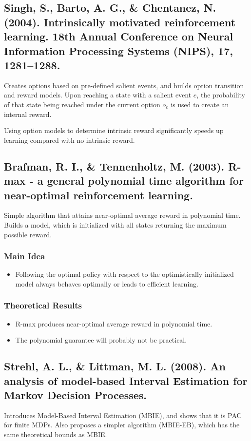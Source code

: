 \documentclass[12pt, oneside]{amsart}
\begin{document}
\subsection*{Singh, S., Barto, A. G., \& Chentanez, N. (2004). Intrinsically motivated reinforcement learning. 18th Annual Conference on Neural Information Processing Systems (NIPS), 17, 1281–1288.}
Creates options based on pre-defined salient events, and builds option transition and reward models. Upon reaching a state with a salient event $e$, the probability of that state being reached under the current option $o_e$ is used to create an internal reward.

Using option models to determine intrinsic reward significantly speeds up learning compared with no intrinsic reward.

\subsection*{Brafman, R. I., \& Tennenholtz, M. (2003). R-max - a general polynomial time algorithm for near-optimal reinforcement learning.}
Simple algorithm that attains near-optimal average reward in polynomial time. Builds a model, which is initialized with all states returning the maximum possible reward. 
\subsubsection*{Main Idea}
\begin{itemize}
	\item Following the optimal policy with respect to the optimistically initialized model always behaves optimally or leads to efficient learning. 
\end{itemize}

\subsubsection*{Theoretical Results}
\begin{itemize}
	\item R-max produces near-optimal average reward in polynomial time. 
	\item The polynomial guarantee will probably not be practical.
\end{itemize}

\subsection*{Strehl, A. L., \& Littman, M. L. (2008). An analysis of model-based Interval Estimation for Markov Decision Processes.}
Introduces Model-Based Interval Estimation (MBIE), and shows that it is PAC for finite MDPs. Also proposes a simpler algorithm (MBIE-EB), which has the same theoretical bounds as MBIE. 
\end{document}
